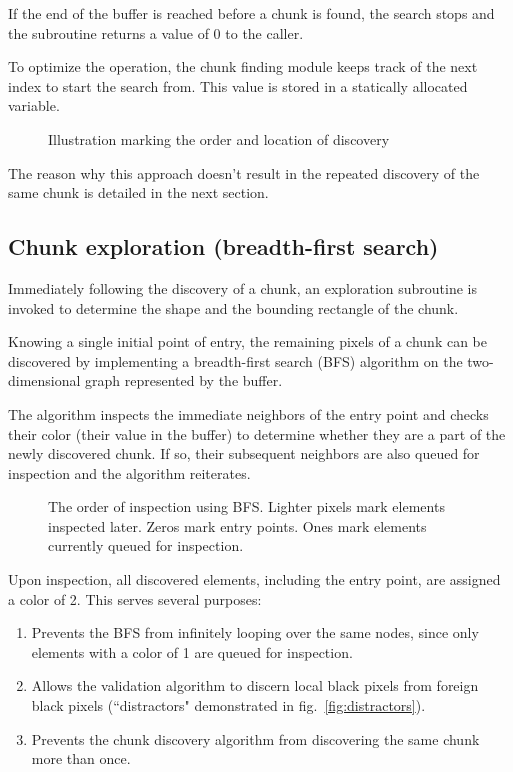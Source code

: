 \documentclass{article}
\begin{document}
	If the end of the buffer is reached before a chunk is found, the search
	stops and the subroutine returns a value of 0 to the caller.
	
	To optimize the operation, the chunk finding module keeps track of the next
	index to start the search from. This value is stored in a statically
	allocated variable.
	
	\begin{figure}[h]
		\centering
		\caption{Illustration marking the order and location of discovery}
	\end{figure}
	
	The reason why this approach doesn't result in the repeated discovery of the
	same chunk is detailed in the next section.
	
	\newpage
	\subsection{Chunk exploration (breadth-first search)}
	\label{sec:bfs}
	
	Immediately following the discovery of a chunk, an exploration subroutine
	is invoked to determine the shape and the bounding rectangle of the chunk.
	
	Knowing a single initial point of entry, the remaining pixels of a chunk can
	be discovered by implementing a breadth-first search (BFS) algorithm on the
	two-dimensional graph represented by the buffer.
	
	The algorithm inspects the immediate neighbors of the entry point and checks
	their color (their value in the buffer) to determine whether they are a part
	of the newly discovered chunk. If so, their subsequent neighbors are also
	queued for inspection and the algorithm reiterates.
	
	\begin{figure}[h]
		\centering
		\caption{The order of inspection using BFS. Lighter pixels mark elements
		inspected later. Zeros mark entry points. Ones mark elements currently
		queued for inspection.}
	\end{figure}
	
	Upon inspection, all discovered elements, including the entry point, are
	assigned a color of 2. This serves several purposes:
	\begin{enumerate}
		\item Prevents the BFS from infinitely looping over the same nodes,
		since only elements with a color of 1 are queued for inspection.
		\item Allows the validation algorithm to discern local black pixels
		from foreign black pixels (``distractors" demonstrated in
		fig.~\ref{fig:distractors}).
		\item Prevents the chunk discovery algorithm from discovering the same
		chunk more than once.
	\end{enumerate}
	
\end{document}
